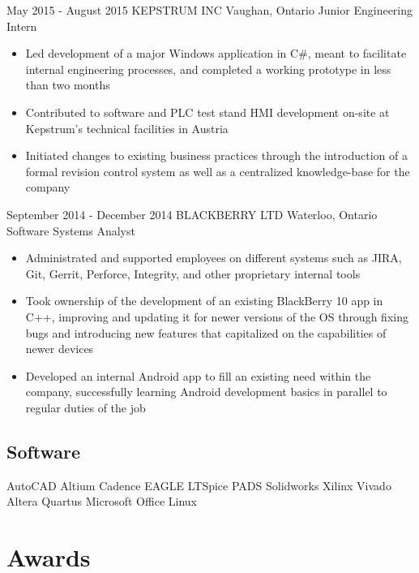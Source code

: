 \documentclass[hidelinks]{kkurucz-cv}
\begin{document}
\begin{minipage}{\textwidth}
\begin{entrylist}
\entry
{May 2015 - August 2015}
{KEPSTRUM INC}
{Vaughan, Ontario}
{Junior Engineering Intern}
{
\begin{itemize}
	\item Led development of a major Windows application in C\#, meant to facilitate internal engineering processes, and completed a working prototype in less than two months
	\item Contributed to software and PLC test stand HMI development on-site at Kepstrum’s technical facilities in Austria
	\item Initiated changes to existing business practices through the introduction of a formal revision control system as well as a centralized knowledge-base for the company
\end{itemize}
}

\entry
{September 2014 - December 2014}
{BLACKBERRY LTD}
{Waterloo, Ontario}
{Software Systems Analyst}
{
\begin{itemize}
	\item Administrated and supported employees on different systems such as JIRA, Git, Gerrit, Perforce, Integrity, and other proprietary internal tools
	\item Took ownership of the development of an existing BlackBerry 10 app in C++, improving and updating it for newer versions of the OS through fixing bugs and introducing new features that capitalized on the capabilities of newer devices 
	\item Developed an internal Android app to fill an existing need within the company, successfully learning Android development basics in parallel to regular duties of the job
\end{itemize}
}
\end{entrylist}
\end{minipage}

\newpage

\begin{aside2}
\section{Software}
AutoCAD
Altium
Cadence
EAGLE
LTSpice
PADS
Solidworks
Xilinx Vivado
Altera Quartus
Microsoft Office
Linux
\end{aside2}

\section{Awards}
\end{document}
